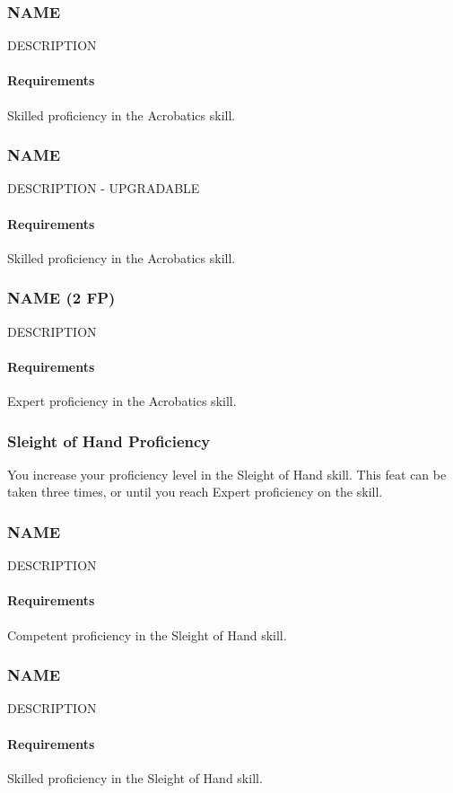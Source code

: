 \subsubsection{NAME} \label{feat::name}
    DESCRIPTION
    \paragraph{Requirements} Skilled proficiency in the Acrobatics skill.
\subsubsection{NAME} \label{feat::name}
    DESCRIPTION - UPGRADABLE
    \paragraph{Requirements} Skilled proficiency in the Acrobatics skill.
\subsubsection{NAME (2 FP)} \label{feat::name}
    DESCRIPTION
    \paragraph{Requirements} Expert proficiency in the Acrobatics skill.
\subsubsection{Sleight of Hand Proficiency} \label{feat::sleightofhandprof}
    You increase your proficiency level in the Sleight of Hand skill.
    This feat can be taken three times, or until you reach Expert proficiency on the skill.
\subsubsection{NAME} \label{feat::name}
    DESCRIPTION
    \paragraph{Requirements} Competent proficiency in the Sleight of Hand skill.
\subsubsection{NAME} \label{feat::name}
    DESCRIPTION
    \paragraph{Requirements} Skilled proficiency in the Sleight of Hand skill.
